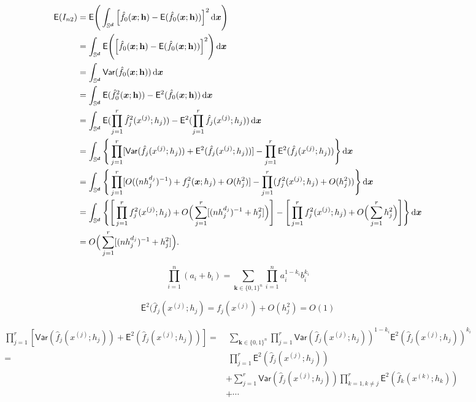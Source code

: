 \documentclass{article}
\begin{document}
\begin{align*}
        \mathsf{E} (I_{n2}) &= \mathsf{E} \Bigg( \int_{\mathbb{S}^{\boldsymbol{d}}} \Big[ \hat{f}_{0}(\boldsymbol{x};\mathbf h) - \mathsf{E} (\hat{f}_{0}(\boldsymbol{x};\mathbf h)) \Big]^2 \,\mathrm{d} \boldsymbol{x} \Bigg) \\
        &= \int_{\mathbb{S}^{\boldsymbol{d}}} \mathsf{E} \Bigg( \Big[ \hat{f}_{0}(\boldsymbol{x};\mathbf h) - \mathsf{E} (\hat{f}_{0}(\boldsymbol{x};\mathbf h)) \Big]^2 \Bigg) \,\mathrm{d} \boldsymbol{x} \\
        &= \int_{\mathbb{S}^{\boldsymbol{d}}} \mathsf{Var} (\hat{f}_{0}(\boldsymbol{x};\mathbf h)) \,\mathrm{d} \boldsymbol{x} \\
        &= \int_{\mathbb{S}^{\boldsymbol{d}}} \mathsf{E} (\hat{f}_{0}^2(\boldsymbol{x};\mathbf h)) - \mathsf{E}^2 (\hat{f}_{0}(\boldsymbol{x};\mathbf h)) \,\mathrm{d} \boldsymbol{x} \\
        &= \int_{\mathbb{S}^{\boldsymbol{d}}} \mathsf{E} (\prod_{j=1}^r \hat{f}_{j}^2(x^{(j)};h_j)) - \mathsf{E}^2 (\prod_{j=1}^r \hat{f}_{j}(x^{(j)};h_j)) \,\mathrm{d} \boldsymbol{x} \\
        &= \int_{\mathbb{S}^{\boldsymbol{d}}} \Bigg\{ \prod_{j=1}^{r} [\mathsf{Var} (\hat{f}_j(x^{(j)};h_j)) + \mathsf{E}^2 (\hat{f}_j(x^{(j)};h_j))] - \prod_{j=1}^{r} \mathsf{E}^2 (\hat{f}_j(x^{(j)};h_j)) \Bigg\} \,\mathrm{d} \boldsymbol{x} \\
         &= \int_{\mathbb{S}^{\boldsymbol{d}}} \Bigg\{ \prod_{j=1}^{r} [O((nh_j^{d_j})^{-1}) + f_{j}^2 (\boldsymbol{x}; h_j) + O(h_j^2)] - \prod_{j=1}^{r} (f_{j}^2 (x^{(j)}; h_j) + O(h_j^2)) \Bigg\} \,\mathrm{d} \boldsymbol{x} \\
          &= \int_{\mathbb{S}^{\boldsymbol{d}}} \Bigg\{ \Bigg[\prod_{j=1}^{r} f_{j}^2 (x^{(j)}; h_j) + O\Big(\sum_{j=1}^r [(nh_j^{d_j})^{-1} + h_j^2]\Big)\Bigg] - \Bigg[\prod_{j=1}^{r} f_{j}^2 (x^{(j)}; h_j) + O\Big(\sum_{j=1}^{r} h_j^2\Big)\Bigg] \Bigg\} \,\mathrm{d} \boldsymbol{x} \\
          &= O\Big(\sum_{j=1}^r [(nh_j^{d_j})^{-1} + h_j^2]\Big).
    \end{align*}

    $$\prod_{i=1}^n (a_i + b_i) = \sum_{\boldsymbol{k} \in \{0,1\}^n} \prod_{i=1}^n a_i^{1 -k_i} b_i^{k_i}$$

$$
\mathsf{E}^2 (\hat{f}_j(x^{(j)};h_j)=f_j(x^{(j)})+O(h_j^2)=O(1)
$$


\begin{align*}
    \prod_{j=1}^{r} [\mathsf{Var} (\hat{f}_j(x^{(j)};h_j)) + \mathsf{E}^2 (\hat{f}_j(x^{(j)};h_j))]=&\;\sum_{\boldsymbol{k} \in \{0,1\}^n} \prod_{j=1}^{r} \mathsf{Var} (\hat{f}_j(x^{(j)};h_j))^{1 -k_i} \mathsf{E}^2 (\hat{f}_j(x^{(j)};h_j))^{k_i}\\
    =&\;\prod_{j=1}^{r} \mathsf{E}^2 (\hat{f}_j(x^{(j)};h_j))\\
    &+\sum_{j=1}^r \mathsf{Var} (\hat{f}_j(x^{(j)};h_j)) \prod_{k=1,k\neq j}^{r} \mathsf{E}^2 (\hat{f}_k(x^{(k)};h_k))\\
    &+\cdots
\end{align*}
\end{document}
